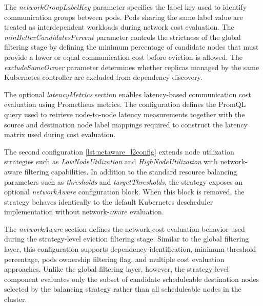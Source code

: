 The \textit{networkGroupLabelKey} parameter specifies the label key used to identify communication groups between pods. Pods sharing the same label value are treated as interdependent workloads during network cost evaluation. The \textit{minBetterCandidatesPercent} parameter controls the strictness of the global filtering stage by defining the minimum percentage of candidate nodes that must provide a lower or equal communication cost before eviction is allowed. The \textit{excludeSameOwner} parameter determines whether replicas managed by the same Kubernetes controller are excluded from dependency discovery.

The optional \textit{latencyMetrics} section enables latency-based communication cost evaluation using Prometheus metrics. The configuration defines the PromQL query used to retrieve node-to-node latency measurements together with the source and destination node label mappings required to construct the latency matrix used during cost evaluation.

\begin{figure}[tbp]
    \centering
    \begin{minipage}{0.95\textwidth}
    
    \end{minipage}
\end{figure}

The second configuration \ref{lst:netaware_l2config} extends node utilization strategies such as \textit{LowNodeUtilization} and \textit{HighNodeUtilization} with network-aware filtering capabilities. In addition to the standard resource balancing parameters such as \textit{thresholds} and \textit{targetThresholds}, the strategy exposes an optional \textit{networkAware} configuration block. When this block is removed, the strategy behaves identically to the default Kubernetes descheduler implementation without network-aware evaluation.

The \textit{networkAware} section defines the network cost evaluation behavior used during the strategy-level eviction filtering stage. Similar to the global filtering layer, this configuration supports dependency identification, minimum threshold percentage, pods ownership filtering flag, and multiple cost evaluation approaches. Unlike the global filtering layer, however, the strategy-level component evaluates only the subset of candidate scheduleable destination nodes selected by the balancing strategy rather than all scheduleable nodes in the cluster.

